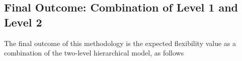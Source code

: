 


\begin{table}[htbp]
\centering
\caption{Results overview between the two models developed under level~2 of the hierarchical model for conditional flexibility estimation.}
\vspace*{3mm}
\label{tab:level2-scores}
\end{table}

\subsection{Final Outcome: Combination of Level 1 and Level 2}  \label{Sect:ResultsFinalOutcome} 
The final outcome of this methodology is the expected flexibility value as a combination of the two-level hierarchical model, as follows

